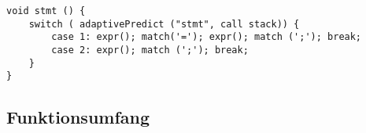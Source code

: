 \begin{lstlisting}[style=CStyle, frame=b, caption=Code zum Erkennen von stmt,label=lst:stmt]   
void stmt () { 
    switch ( adaptivePredict ("stmt", call stack)) {
        case 1: expr(); match('='); expr(); match (';'); break;
        case 2: expr(); match (';'); break;
    }   
}
\end{lstlisting}

\subsection{Funktionsumfang}



